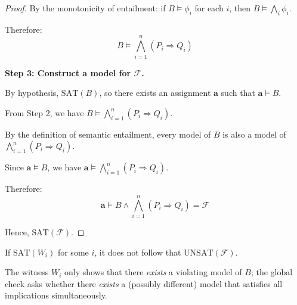 \begin{proof}
By the monotonicity of entailment: if $B \models \phi_i$ for each $i$, then $B \models \bigwedge_i \phi_i$.

Therefore:
\[
  B \models \bigwedge_{i=1}^n (P_i \Rightarrow Q_i)
\]

\textbf{Step 3: Construct a model for $\mathcal{F}$.}

By hypothesis, $\mathrm{SAT}(B)$, so there exists an assignment $\mathbf{a}$ such that $\mathbf{a} \models B$.

From Step 2, we have $B \models \bigwedge_{i=1}^n (P_i \Rightarrow Q_i)$.

By the definition of semantic entailment, every model of $B$ is also a model of $\bigwedge_{i=1}^n (P_i \Rightarrow Q_i)$.

Since $\mathbf{a} \models B$, we have $\mathbf{a} \models \bigwedge_{i=1}^n (P_i \Rightarrow Q_i)$.

Therefore:
\[
  \mathbf{a} \models B \wedge \bigwedge_{i=1}^n (P_i \Rightarrow Q_i) = \mathcal{F}
\]

Hence, $\mathrm{SAT}(\mathcal{F})$.
\end{proof}

\begin{theorem}
\label{thm:local-not-global}
If $\mathrm{SAT}(W_i)$ for some $i$, it does not follow that $\mathrm{UNSAT}(\mathcal{F})$.
\end{theorem}

The witness $W_i$ only shows that there \emph{exists} a violating model of $B$; the global check asks whether there \emph{exists} a (possibly different) model that satisfies all implications simultaneously.

